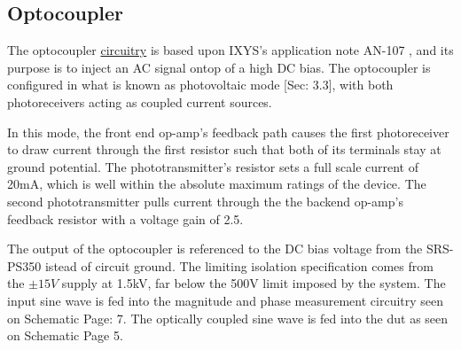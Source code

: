 \subsection{Optocoupler}
\label{sec:opto}

The optocoupler \hyperlink{sch:opto}{circuitry} is based upon IXYS's application note AN-107 \cite{locAppNote}, and its purpose is to inject an AC signal ontop of a high DC bias. The optocoupler is configured in what is known as photovoltaic mode \cite{locAppNote}[Sec: 3.3], with both photoreceivers acting as coupled current sources.

In this mode, the front end op-amp's feedback path causes the first photoreceiver to draw current through the first resistor such that both of its terminals stay at ground potential. The phototransmitter's resistor sets a full scale current of 20mA, which is well within the absolute maximum ratings of the device. The second phototransmitter pulls current through the the backend op-amp's feedback resistor with a voltage gain of 2.5.

The output of the optocoupler is referenced to the DC bias voltage from the SRS-PS350 istead of circuit ground. The limiting isolation specification comes from the $\pm 15V$ supply at 1.5kV, far below the 500V limit imposed by the system. The input sine wave is fed into the magnitude and phase measurement circuitry seen on Schematic Page: 7. The optically coupled sine wave is fed into the \gls{dut} as seen on Schematic Page 5.

